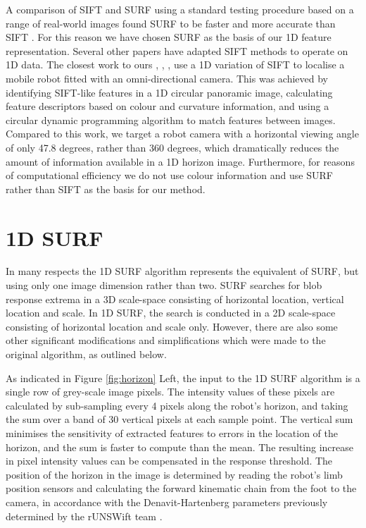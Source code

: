 \documentclass[runningheads,a4paper]{llncs}
\begin{document}
A comparison of SIFT and SURF using  a standard testing procedure based on a range of real-world images found SURF to be faster and more accurate than SIFT \cite{juan2009comparison}. For this reason we have chosen SURF as the basis of our 1D feature representation. Several other papers have adapted SIFT methods to operate on 1D data. The closest work to ours \cite{briggs2004scale}, \cite{briggs2006robot}, \cite{briggs2006matching}, use a 1D variation of SIFT to localise a mobile robot fitted with an omni-directional camera. This was achieved by identifying SIFT-like features in a 1D circular panoramic image, calculating feature descriptors based on colour and curvature information, and using a circular dynamic programming algorithm to match features between images. Compared to this work, we target a robot camera with a horizontal viewing angle of only 47.8 degrees, rather than 360 degrees, which dramatically reduces the amount of information available in a 1D horizon image. Furthermore, for reasons of computational efficiency we do not use colour information and use SURF rather than SIFT as the basis for our method. 

\section{1D SURF}
\label{sec:1DSURF}

In many respects the 1D SURF algorithm represents the equivalent of SURF, but using only one image dimension rather than two.  SURF searches for blob response extrema in a 3D scale-space consisting of horizontal location, vertical location and scale. In 1D SURF, the search is conducted in a 2D scale-space consisting of horizontal location and scale only. However, there are also some other significant modifications and simplifications which were made to the original algorithm, as outlined below. 

As indicated in Figure \ref{fig:horizon} Left, the input to the 1D SURF algorithm is a single row of grey-scale image pixels. The intensity values of these pixels are calculated by sub-sampling every 4 pixels along the robot's horizon, and taking the sum over a band of 30 vertical pixels at each sample point. The vertical sum minimises the sensitivity of extracted features to errors in the location of the horizon, and the sum is faster to compute than the mean. The resulting increase in pixel intensity values can be compensated in the response threshold. The position of the horizon in the image is determined by reading the robot's limb position sensors and calculating the forward kinematic chain from the foot to the camera, in accordance with the Denavit-Hartenberg parameters previously determined by the rUNSWift team \cite{HarDen55}.
\end{document}
